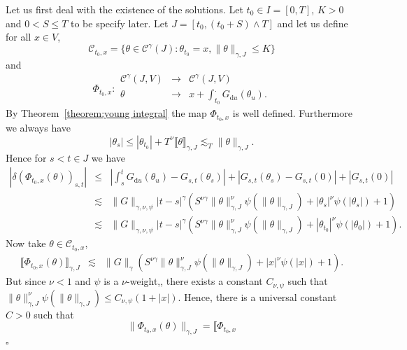 \documentclass[a4paper,11pt]{article}
\newcommand{\mathd}{\mathrm{d}}
\newcommand{\nocomma}{}
\newenvironment{proof}{{\sc Proof.}}{\hfill$\square$}
\newcommand{\CC}{\mathscr C}
\begin{document}
\begin{proof}
  Let us first deal with the existence of the solutions. Let $t_{0} \in I= [
  0,T ]$, $K>0$ and $0<S \leqslant T$ to be specify later. Let $J= [t_{0}
  ,(t_{0} +S) \wedge T]$ and let us define for all $x \in V$,
  \[ \mathcal{C}_{t_{0} ,x} = \{\theta \in \CC^{\gamma} (J): \theta_{t_{0}}
     =x,\| \theta \|_{\gamma ,J} \leqslant K\} \]
  and
  \[ \Phi_{t_{0} ,x} : \begin{array}{ccc}
       \CC^{\gamma} (J,V) & \rightarrow & \CC^{\gamma} (J \nocomma ,V)\\
       \theta & \rightarrow & x+ \int_{t_{0}}^{.} G_{\mathd u} ( \theta_{u} ).
     \end{array} \]
  By Theorem~\ref{theorem:young integral} the map $\Phi_{t_{0} ,x}$ is well defined.
  Furthermore we always have
  \[ | \theta_{s} | \leqslant | \theta_{t_{0}} | +T^{\nu} \llbracket \theta
     \rrbracket_{\gamma ,J} \lesssim_{T} \| \theta \|_{\gamma ,J} .\]
  Hence for $s<t \in J$ we have
  \begin{eqnarray}
    | \delta ( \Phi_{t_{0} ,x} ( \theta ))_{s,t} | & \leqslant & \left\lvert
    \int_{s}^{t} G_{\mathd u} ( \theta_{u} )-G_{s,t} ( \theta_{s} ) \right\lvert +
    |G_{s,t} ( \theta_{s} )-G_{s,t} (0)| + |G_{s,t} (0)| \nonumber\\
    & \lesssim & \|G\|_{\gamma , \nu , \psi}  |t-s|^{\gamma}  ( S^{\nu
    \gamma} \| \theta \|^{\nu}_{\gamma ,J} \psi ( \| \theta \|_{\gamma ,J} ) +
    | \theta_{s} |^{\nu} \psi ( | \theta_{s} | ) +1 ) \nonumber\\
    & \lesssim & \|G\|_{\gamma , \nu , \psi}  |t-s|^{\gamma}  ( S^{\nu
    \gamma} \| \theta \|^{\nu}_{\gamma ,J} \psi ( \| \theta \|_{\gamma ,J} )
    +| \theta_{t_{0}} |^{\nu} \psi ( | \theta_{0} | ) +1 ) . \label{majoration
    bound}
  \end{eqnarray}
  Now take $\theta \in \mathcal{C}_{t_{0} ,x}$,
  \begin{eqnarray*}
    \llbracket \Phi_{t_{0} ,x} ( \theta ) \rrbracket_{\gamma ,J} & \lesssim &
    \|G\|_{\gamma} (S^{\nu \gamma} \| \theta \|^{\nu}_{\gamma ,J} \psi ( \|
    \theta \|_{\gamma ,J} ) +|x|^{\nu} \psi ( | x | ) +1).
  \end{eqnarray*}
  But since $\nu <1$ and $\psi$ is a $\nu$-weight,, there exists a constant
  $C_{\nu , \psi}$ such that $\| \theta \|^{\nu}_{\gamma ,J} \psi ( \| \theta
  \|_{\gamma ,J} ) \leqslant C_{\nu , \psi} ( 1+ | x | )$. Hence, there is a
  universal constant $C>0$ such that
  \[ \| \Phi_{t_{0} ,x} ( \theta ) \|_{\gamma ,J} = \llbracket \Phi_{t_{0} ,x}
\]
\end{proof}
\end{document}
